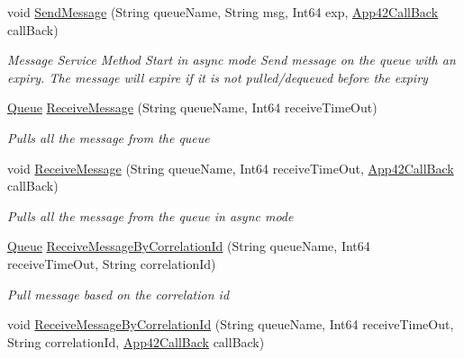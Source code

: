 \begin{DoxyCompactItemize}
void \hyperlink{classcom_1_1shephertz_1_1app42_1_1paas_1_1sdk_1_1csharp_1_1message_1_1_queue_service_a57be25bcc54268a2b28f6eb54df97152}{Send\+Message} (String queue\+Name, String msg, Int64 exp, \hyperlink{interfacecom_1_1shephertz_1_1app42_1_1paas_1_1sdk_1_1csharp_1_1_app42_call_back}{App42\+Call\+Back} call\+Back)
\begin{DoxyCompactList}\small\item\em Message Service Method Start in async mode Send message on the queue with an expiry. The message will expire if it is not pulled/dequeued before the expiry \end{DoxyCompactList}\item 
\hyperlink{classcom_1_1shephertz_1_1app42_1_1paas_1_1sdk_1_1csharp_1_1message_1_1_queue}{Queue} \hyperlink{classcom_1_1shephertz_1_1app42_1_1paas_1_1sdk_1_1csharp_1_1message_1_1_queue_service_a6d576948766c5a6693e90822bf34e057}{Receive\+Message} (String queue\+Name, Int64 receive\+Time\+Out)
\begin{DoxyCompactList}\small\item\em Pulls all the message from the queue \end{DoxyCompactList}\item 
void \hyperlink{classcom_1_1shephertz_1_1app42_1_1paas_1_1sdk_1_1csharp_1_1message_1_1_queue_service_a81a19ca7d0e6b460e817dba44f42d1e2}{Receive\+Message} (String queue\+Name, Int64 receive\+Time\+Out, \hyperlink{interfacecom_1_1shephertz_1_1app42_1_1paas_1_1sdk_1_1csharp_1_1_app42_call_back}{App42\+Call\+Back} call\+Back)
\begin{DoxyCompactList}\small\item\em Pulls all the message from the queue in async mode \end{DoxyCompactList}\item 
\hyperlink{classcom_1_1shephertz_1_1app42_1_1paas_1_1sdk_1_1csharp_1_1message_1_1_queue}{Queue} \hyperlink{classcom_1_1shephertz_1_1app42_1_1paas_1_1sdk_1_1csharp_1_1message_1_1_queue_service_afa92ab1cca7a4890b912f4e1d67a4d44}{Receive\+Message\+By\+Correlation\+Id} (String queue\+Name, Int64 receive\+Time\+Out, String correlation\+Id)
\begin{DoxyCompactList}\small\item\em Pull message based on the correlation id \end{DoxyCompactList}\item 
void \hyperlink{classcom_1_1shephertz_1_1app42_1_1paas_1_1sdk_1_1csharp_1_1message_1_1_queue_service_ae3db495209064d60ab8e48062188a335}{Receive\+Message\+By\+Correlation\+Id} (String queue\+Name, Int64 receive\+Time\+Out, String correlation\+Id, \hyperlink{interfacecom_1_1shephertz_1_1app42_1_1paas_1_1sdk_1_1csharp_1_1_app42_call_back}{App42\+Call\+Back} call\+Back)

\end{DoxyCompactItemize}
